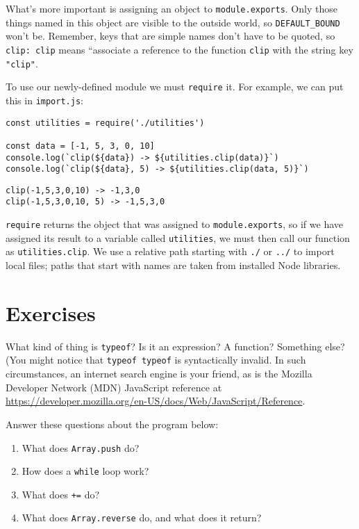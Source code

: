 What's more important is assigning an object to \texttt{module.exports}.
Only those things named in this object are visible to the outside world,
so \texttt{DEFAULT\_BOUND} won't be.
Remember,
keys that are simple names don't have to be quoted,
so \texttt{clip:\ clip} means ``associate a reference to the function \texttt{clip} with the string key \texttt{"clip"}.

To use our newly-defined module we must \texttt{require} it.
For example,
we can put this in \texttt{import.js}:

\begin{verbatim}
const utilities = require('./utilities')

const data = [-1, 5, 3, 0, 10]
console.log(`clip(${data}) -> ${utilities.clip(data)}`)
console.log(`clip(${data}, 5) -> ${utilities.clip(data, 5)}`)
\end{verbatim}

\begin{verbatim}
clip(-1,5,3,0,10) -> -1,3,0
clip(-1,5,3,0,10, 5) -> -1,5,3,0
\end{verbatim}

\texttt{require} returns the object that was assigned to \texttt{module.exports},
so if we have assigned its result to a variable called \texttt{utilities},
we must then call our function as \texttt{utilities.clip}.
We use a relative path starting with \texttt{./} or \texttt{../} to import local files;
paths that start with names are taken from installed Node libraries.

\section{Exercises}\label{s:basics-exercises}


What kind of thing is \texttt{typeof}?
Is it an expression?
A function?
Something else?
(You might notice that \texttt{typeof\ typeof} is syntactically invalid.
In such circumstances,
an internet search engine is your friend,
as is the Mozilla Developer Network (MDN) JavaScript reference
at \url{https://developer.mozilla.org/en-US/docs/Web/JavaScript/Reference}.


Answer these questions about the program below:

\begin{enumerate}
\item
  What does \texttt{Array.push} do?
\item
  How does a \texttt{while} loop work?
\item
  What does \texttt{+=} do?
\item
  What does \texttt{Array.reverse} do, and what does it return?
\end{enumerate}

